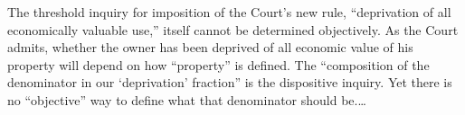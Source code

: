 %
%
%

The threshold inquiry for imposition of the Court's new rule, ``deprivation of
all economically valuable use,'' itself cannot be determined objectively. As the
Court admits, whether the owner has been deprived of all economic value of his
property will depend on how ``property'' is defined. The ``composition of the
denominator in our `deprivation' fraction'' is the dispositive inquiry. Yet
there is no ``objective'' way to define what that denominator should be.\ldots

